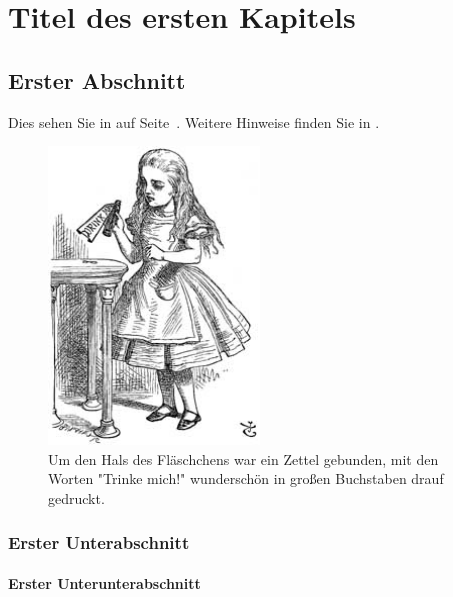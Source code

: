 \chapter{Titel des ersten Kapitels}
\label{chapter1}

\section{Erster Abschnitt}

\lipsum[1-2] Dies sehen Sie in  auf Seite~\pageref{fig:Alice}. Weitere Hinweise finden Sie in \cite{latex-einfuehrung}.


\begin{figure}[tb]
    \centering
    \includegraphics[width=0.5\textwidth]{images/alice.jpg}
    \caption[Alice mit Trinkflasche]{Um den Hals des Fläschchens war ein Zettel gebunden, mit den Worten "Trinke mich!" wunderschön in großen Buchstaben drauf gedruckt.
    \label{fig:Alice}}
\end{figure}

\subsection{Erster Unterabschnitt}

\subsubsection{Erster Unterunterabschnitt}

\lipsum[1-3]

